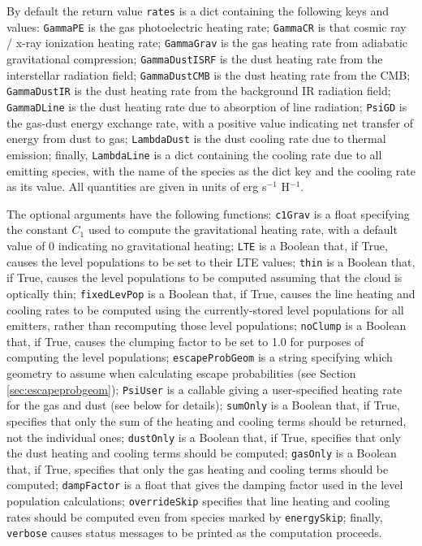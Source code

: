 \documentclass[12pt]{article}
\begin{document}
By default the return value \verb=rates= is a dict containing the following keys and values: \verb=GammaPE= is the gas photoelectric heating rate; \verb=GammaCR= is that cosmic ray / x-ray ionization heating rate; \verb=GammaGrav= is the gas heating rate from adiabatic gravitational compression; \verb=GammaDustISRF= is the dust heating rate from the interstellar radiation field; \verb=GammaDustCMB= is the dust heating rate from the CMB; \verb=GammaDustIR= is the dust heating rate from the background IR radiation field; \verb=GammaDLine= is the dust heating rate due to absorption of line radiation; \verb=PsiGD= is the gas-dust energy exchange rate, with a positive value indicating net transfer of energy from dust to gas; \verb=LambdaDust= is the dust cooling rate due to thermal emission; finally, \verb=LambdaLine= is a dict containing the cooling rate due to all emitting species, with the name of the species as the dict key and the cooling rate as its value. All quantities are given in units of erg s$^{-1}$ H$^{-1}$.

The optional arguments have the following functions: \verb=c1Grav= is a float specifying the constant $C_1$ used to compute the gravitational heating rate, with a default value of 0 indicating no gravitational heating; \verb=LTE= is a Boolean that, if True, causes the level populations to be set to their LTE values; \verb=thin= is a Boolean that, if True, causes the level populations to be computed assuming that the cloud is optically thin; \verb=fixedLevPop= is a Boolean that, if True, causes the line heating and cooling rates to be computed using the currently-stored level populations for all emitters, rather than recomputing those level populations; \verb=noClump= is a Boolean that, if True, causes the clumping factor to be set to 1.0 for purposes of computing the level populations; \verb=escapeProbGeom= is a string specifying which geometry to assume when calculating escape probabilities (see Section \ref{sec:escapeprobgeom}); \verb=PsiUser= is a callable giving a user-specified heating rate for the gas and dust (see below for details); \verb=sumOnly= is a Boolean that, if True, specifies that only the sum of the heating and cooling terms should be returned, not the individual ones; \verb=dustOnly= is a Boolean that, if True, specifies that only the dust heating and cooling terms should be computed; \verb=gasOnly= is a Boolean that, if True, specifies that only the gas heating and cooling terms should be computed; \verb=dampFactor= is a float that gives the damping factor used in the level population calculations; \verb=overrideSkip= specifies that line heating and cooling rates should be computed even from species marked by \verb=energySkip=; finally, \verb=verbose= causes status messages to be printed as the computation proceeds.
\end{document}
